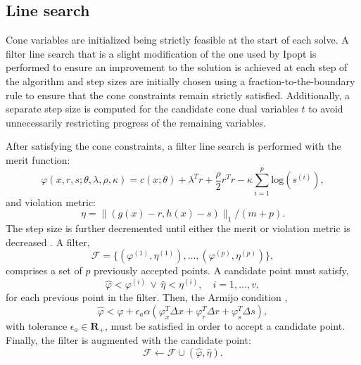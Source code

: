 \subsection{Line search}
Cone variables are initialized being strictly feasible at the start of each solve. A filter line search that is a slight modification of the one used by Ipopt \cite{wachter2006implementation} is performed to ensure an improvement to the solution is achieved at each step of the algorithm and step sizes are initially chosen using a fraction-to-the-boundary rule to ensure that the cone constraints remain strictly satisfied. Additionally, a separate step size is computed for the candidate cone dual variables $t$ to avoid unnecessarily restricting progress of the remaining variables.

After satisfying the cone constraints, a filter line search is performed with the merit function:
\begin{equation}
	\varphi(x, r, s; \theta, \lambda, \rho, \kappa) = c(x; \theta) + \lambda^T r + \frac{\rho}{2} r^T r - \kappa \sum \limits_{i = 1}^p \mbox{log}(s^{(i)}), \label{calipso_merit}
\end{equation}
and violation metric:
\begin{equation} 
	\eta = \|(g(x) - r, h(x) - s) \|_1 / (m + p). \label{slack_constraint_violation}
\end{equation}
The step size is further decremented until either the merit or violation metric is decreased \cite{wachter2005line}. A filter, 
\begin{equation}
\mathcal{F} = \{(\varphi^{(1)}, \eta^{(1)}), \dots, (\varphi^{(p)}, \eta^{(p)})\},
\end{equation}
comprises a set of $p$ previously accepted points. 
A candidate point must satisfy, 
\begin{equation} 
  \hat{\varphi} < \varphi^{(i)} \, \lor \, \hat{\eta} < \eta^{(i)}, \quad i = 1, \dots, v,
\end{equation}
for each previous point in the filter. Then, the Armijo condition \cite{nocedal2006numerical},
\begin{equation} 
  \hat{\varphi} < \varphi + \epsilon_a \alpha ( \varphi_x^T \Delta x + \varphi_r^T \Delta r + \varphi_s^T \Delta s), \label{calipso_armijo}
\end{equation}
with tolerance $\epsilon_a \in \mathbf{R}_+$, must be satisfied in order to accept a candidate point. Finally, the filter is augmented with the candidate point:
\begin{equation} 
  \mathcal{F} \leftarrow \mathcal{F} \cup (\hat{\varphi}, \hat{\eta}).
\end{equation}

